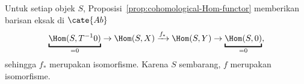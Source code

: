 \begin{bukti}
	Untuk setiap objek $S$, Proposisi~\ref{prop:cohomological-Hom-functor}
	memberikan barisan eksak di $\cate{Ab}$
	\[ \underbracket{\Hom(S, T^{-1} 0)}_{= 0} \to \Hom(S, X) \xrightarrow{f_*} \Hom(S, Y) \to \underbracket{\Hom(S, 0)}_{= 0}, \]
	sehingga $f_*$ merupakan isomorfisme. Karena $S$ sembarang, $f$ merupakan
	isomorfisme.
\end{bukti}
